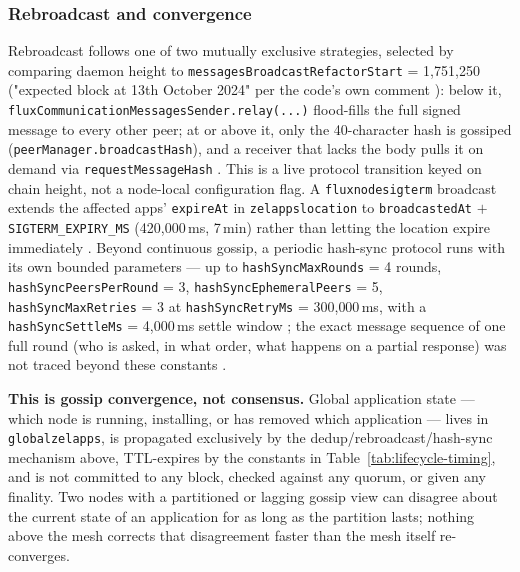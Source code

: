 \subsubsection{Rebroadcast and convergence}
Rebroadcast follows one of two mutually exclusive strategies, selected by comparing daemon height
to \texttt{messages\allowbreak{}Broadcast\allowbreak{}Refactor\allowbreak{}Start} = 1{,}751{,}250 ("expected block at 13th October 2024"
per the code's own comment ): below it,
\texttt{fluxCommunicationMessagesSender.\allowbreak{}relay(.\allowbreak{}.\allowbreak{}.\allowbreak{})} flood-fills the full signed message to every
other peer; at or above it, only the 40-character hash is gossiped
(\texttt{peerManager.\allowbreak{}broadcastHash}), and a receiver that lacks the body pulls it on demand via
\texttt{request\allowbreak{}Message\allowbreak{}Hash} .
This is a live protocol transition keyed on chain height, not a node-local configuration flag. A
\texttt{fluxnodesigterm} broadcast extends the affected apps' \texttt{expireAt} in
\texttt{zelappslocation} to \texttt{broadcastedAt} $+$ \texttt{SIGTERM\_EXPIRY\_MS}
(420{,}000\,ms, 7\,min) rather than letting the location expire immediately
. Beyond continuous gossip, a
periodic hash-sync protocol runs with its own bounded parameters — up to
\texttt{hash\allowbreak{}Sync\allowbreak{}Max\allowbreak{}Rounds} = 4 rounds, \texttt{hash\allowbreak{}Sync\allowbreak{}Peers\allowbreak{}Per\allowbreak{}Round} = 3,
\texttt{hash\allowbreak{}Sync\allowbreak{}Ephemeral\allowbreak{}Peers} = 5, \texttt{hash\allowbreak{}Sync\allowbreak{}Max\allowbreak{}Retries} = 3 at
\texttt{hash\allowbreak{}Sync\allowbreak{}Retry\allowbreak{}Ms} = 300{,}000\,ms, with a \texttt{hash\allowbreak{}Sync\allowbreak{}Settle\allowbreak{}Ms} = 4{,}000\,ms settle
window ; the exact message sequence of one full
round (who is asked, in what order, what happens on a partial response) was not traced beyond these
constants \srcinferred.

\textbf{This is gossip convergence, not consensus.} Global application state — which node is
running, installing, or has removed which application — lives in \texttt{globalzelapps}, is
propagated exclusively by the dedup/rebroadcast/hash-sync mechanism above, TTL-expires by the
constants in Table~\ref{tab:lifecycle-timing}, and is not committed to any block, checked against any
quorum, or given any finality. Two nodes with a partitioned or lagging gossip view can disagree
about the current state of an application for as long as the partition lasts; nothing above the
mesh corrects that disagreement faster than the mesh itself re-converges.

